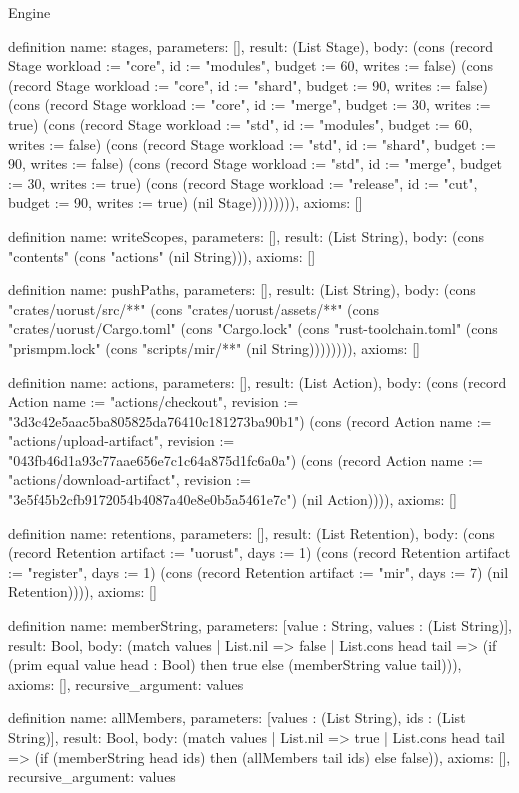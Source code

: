 \begin{lexlean}{Engine}
\begin{semanticmodule}
definition{
  name: stages,
  parameters: [],
  result: (List Stage),
  body: (cons (record Stage {workload := "core", id := "modules", budget := 60, writes := false}) (cons (record Stage {workload := "core", id := "shard", budget := 90, writes := false}) (cons (record Stage {workload := "core", id := "merge", budget := 30, writes := true}) (cons (record Stage {workload := "std", id := "modules", budget := 60, writes := false}) (cons (record Stage {workload := "std", id := "shard", budget := 90, writes := false}) (cons (record Stage {workload := "std", id := "merge", budget := 30, writes := true}) (cons (record Stage {workload := "release", id := "cut", budget := 90, writes := true}) (nil Stage)))))))),
  axioms: []
}

definition{
  name: writeScopes,
  parameters: [],
  result: (List String),
  body: (cons "contents" (cons "actions" (nil String))),
  axioms: []
}

definition{
  name: pushPaths,
  parameters: [],
  result: (List String),
  body: (cons "crates/uorust/src/**" (cons "crates/uorust/assets/**" (cons "crates/uorust/Cargo.toml" (cons "Cargo.lock" (cons "rust-toolchain.toml" (cons "prismpm.lock" (cons "scripts/mir/**" (nil String)))))))),
  axioms: []
}

definition{
  name: actions,
  parameters: [],
  result: (List Action),
  body: (cons (record Action {name := "actions/checkout", revision := "3d3c42e5aac5ba805825da76410c181273ba90b1"}) (cons (record Action {name := "actions/upload-artifact", revision := "043fb46d1a93c77aae656e7c1c64a875d1fc6a0a"}) (cons (record Action {name := "actions/download-artifact", revision := "3e5f45b2cfb9172054b4087a40e8e0b5a5461e7c"}) (nil Action)))),
  axioms: []
}

definition{
  name: retentions,
  parameters: [],
  result: (List Retention),
  body: (cons (record Retention {artifact := "uorust", days := 1}) (cons (record Retention {artifact := "register", days := 1}) (cons (record Retention {artifact := "mir", days := 7}) (nil Retention)))),
  axioms: []
}

definition{
  name: memberString,
  parameters: [value : String, values : (List String)],
  result: Bool,
  body: (match values
    | List.nil => false
    | List.cons head tail => (if (prim equal value head : Bool) then true else (memberString value tail))),
  axioms: [],
  recursive_argument: values
}

definition{
  name: allMembers,
  parameters: [values : (List String), ids : (List String)],
  result: Bool,
  body: (match values
    | List.nil => true
    | List.cons head tail => (if (memberString head ids) then (allMembers tail ids) else false)),
  axioms: [],
  recursive_argument: values
}


\end{semanticmodule}
\end{lexlean}
